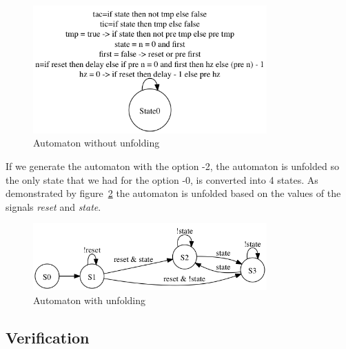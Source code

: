 \documentclass{article}
\begin{document}
\begin{figure}[ht]
\begin{center}
\includegraphics[width=0.8\textwidth, natwidth=610,natheight=642] {automaton-0.png}
\end{center}
\label{automaton-0}
\caption{Automaton without unfolding}
\end{figure}

If we generate the automaton with the option -2, the automaton
is unfolded so the only state that we had for the option -0, is
converted into 4 states. As demonstrated by figure~\ref{automaton-2}
the automaton is unfolded based on the values of the signals \emph{reset}
and \emph{state}.

\begin{figure}[ht]
\label{automaton-2}
\caption{Automaton with unfolding}
\begin{center}
\includegraphics[width=0.8\textwidth, natwidth=610,natheight=642]{automaton-2.png}
\end{center}
\end{figure}


\subsection{Verification}
\end{document}
